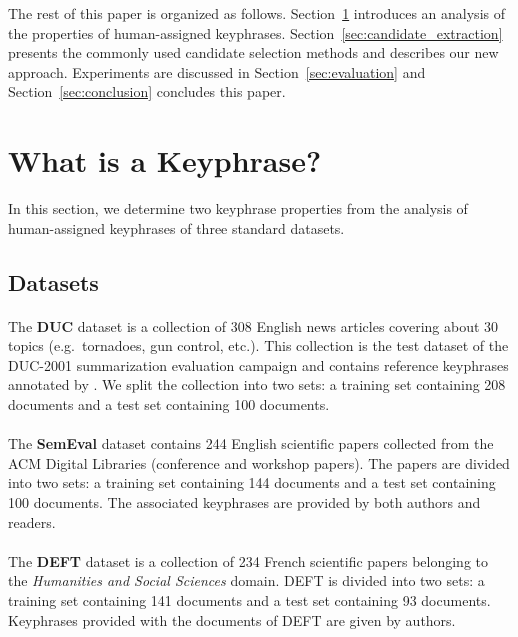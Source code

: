   The rest of this paper is organized as follows.
  Section~\ref{sec:definition_of_candidate_keyphrases} introduces an analysis of
  the properties of human-assigned keyphrases.
  Section~\ref{sec:candidate_extraction} presents the commonly used candidate
  selection methods and describes our new approach. Experiments are discussed in
  Section~\ref{sec:evaluation} and Section~\ref{sec:conclusion} concludes this
  paper.

\section{What is a Keyphrase?}
\label{sec:definition_of_candidate_keyphrases}
  In this section, we determine two keyphrase properties from the analysis of
  human-assigned keyphrases of three standard datasets.

  \subsection{Datasets}
  \label{subsec:keyphrase_extraction_datasets}
    \paragraph{}
    The \textbf{DUC} dataset \cite{over2001duc} is a collection of 308 English
    news articles covering about 30 topics (e.g.~tornadoes, gun control, etc.).
    This collection is the test dataset of the DUC-2001 summarization evaluation
    campaign and contains reference keyphrases annotated by
    . We split the collection into two sets: a
    training set containing 208 documents and a test set containing 100
    documents.

    \paragraph{}
    The \textbf{SemEval} dataset \cite{kim2010semeval} contains 244 English
    scientific papers collected from the ACM Digital Libraries (conference and
    workshop papers). The papers are divided into two sets: a training set
    containing 144 documents and a test set containing 100 documents. The
    associated keyphrases are provided by both authors and readers.

    \paragraph{}
    The \textbf{DEFT} dataset \cite{paroubek2012deft} is a collection of 234
    French scientific papers belonging to the \textit{Humanities and Social
    Sciences} domain. DEFT is divided into two sets: a training set containing
    141 documents and a test set containing 93 documents. Keyphrases provided
    with the documents of DEFT are given by authors.

